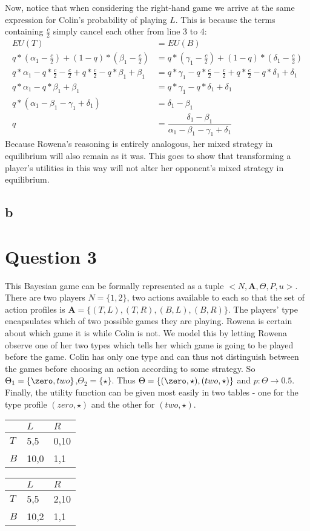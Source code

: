 \documentclass[10pt,a4paper]{article}
\begin{document}
Now, notice that when considering the right-hand game we arrive at the same expression for Colin's probability of playing $L$. This is because the terms containing $\tfrac{c}{2}$ simply cancel each other from line 3 to 4:
\begin{align}
EU(T)&=EU(B) \\
q*(\alpha_1-\tfrac{c}{2})+(1-q)*(\beta_1-\tfrac{c}{2})&=q*(\gamma_1-\tfrac{c}{2})+(1-q)*(\delta_1-\tfrac{c}{2}) \\
q*\alpha_1-q*\tfrac{c}{2}-\tfrac{c}{2}+q*\tfrac{c}{2}-q*\beta_1+\beta_1&=q*\gamma_1-q*\tfrac{c}{2}-\tfrac{c}{2}+q*\tfrac{c}{2}-q*\delta_1+\delta_1 \\
q*\alpha_1-q*\beta_1+\beta_1&=q*\gamma_1-q*\delta_1+\delta_1 \\
q*(\alpha_1-\beta_1-\gamma_1+\delta_1)&=\delta_1-\beta_1 \\
q &= \dfrac{\delta_1-\beta_1}{\alpha_1-\beta_1-\gamma_1+\delta_1}
\end{align}
Because Rowena's reasoning is entirely analogous, her mixed strategy in equilibrium will also remain as it was. This goes to show that transforming a player's utilities in this way will not alter her opponent's mixed strategy in equilibrium.
\subsection*{b}
\section*{Question 3}
This Bayesian game can be formally represented as a tuple $<N,\boldsymbol{A}, \Theta, P, u>$. There are two players $N=\{1,2\}$, two actions available to each so that the set of action profiles is $\boldsymbol{A}=\{(T,L),(T,R),(B,L),(B,R)\}$. The players' type encapsulates which of two possible games they are playing. Rowena is certain about which game it is while Colin is not. We model this by letting Rowena observe one of her two types which tells her which game is going to be played before the game. Colin has only one type and can thus not distinguish between the games before choosing an action according to some strategy. So $\Theta_1=\{\zero, two\}$,$\Theta_2=\{\star\}$. Thus $\Theta=\{(\zero,\star),(two,\star)\}$ and $p: \Theta \rightarrow 0.5$. Finally, the utility function can be given most easily in two tables - one for the type profile $(zero,\star)$ and the other for $(two,\star)$.
\begin{table}[h]
\centering
\begin{tabular}[l]{|l|l|l|}
\hline
          & $L$ & $R$  \\ \hline
$T$     & 5,5   & 0,10 \\ \hline
$B$		& 10,0	& 1,1 \\ \hline
\end{tabular}
\quad
\begin{tabular}[r]{|l|l|l|}
\hline
          & $L$ & $R$  \\ \hline
$T$     & 5,5   & 2,10 \\ \hline
$B$		& 10,2	& 1,1 \\ \hline
\end{tabular}
\end{table}
\end{document}
